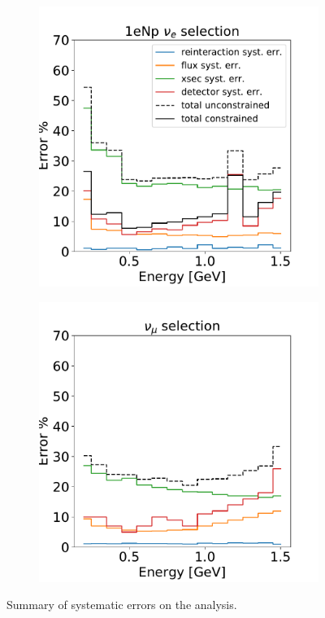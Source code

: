 \begin{figure}[H]
\begin{center}
\begin{subfigure}[b]{0.32\textwidth}
    \includegraphics[width=1.00\textwidth]{Systematics/1eNp_syst_summary.pdf}
    \caption{\label{fig:systsummary:zp}\zpsel}
    \end{subfigure}
    \begin{subfigure}[b]{0.32\textwidth}
    \centering
    \includegraphics[width=1.00\textwidth]{Systematics/numu_syst_summary.pdf}
    \caption{\label{fig:systsummary:numu}\numu}
    \end{subfigure}
\caption{\label{fig:systsummary}Summary of systematic errors on the analysis.}
\end{center}
\end{figure}

